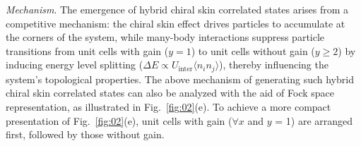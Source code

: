 \documentclass[longbibliography, aps, prx, amsmath, amssymb, amsfonts, twocolumn,superscriptaddress, footinbib]{revtex4-1}
\begin{document}
	\textit{Mechanism}. The emergence of hybrid chiral skin correlated states arises from a competitive mechanism: the chiral skin effect drives particles to accumulate at the corners of the system, while many-body interactions suppress particle transitions from unit cells with gain ($y=1$) to unit cells without gain ($y \geq 2$) by inducing energy level splitting ($\Delta E \propto U_{\text{inter}}\langle n_i n_j \rangle$), thereby influencing the system's topological properties.
	The above mechanism of generating such hybrid chiral skin correlated states can also be analyzed with the aid of Fock space representation, as illustrated in Fig.~\ref{fig:02}(e). 
	To achieve a more compact presentation of Fig.~\ref{fig:02}(e), unit cells with gain ($\forall x$ and $y$ = 1) are arranged first, followed by those without gain. {\color{blue}{The consequence in terms of the time evolution is explained as follows:}}
\end{document}
